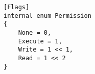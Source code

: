 \begin{listing}[H]
\begin{verbatim}
[Flags]
internal enum Permission
{
    None = 0,
    Execute = 1,
    Write = 1 << 1,
    Read = 1 << 2
}
\end{verbatim}
\caption{Flags Enum}
\label{flagsEnum}
\end{listing}